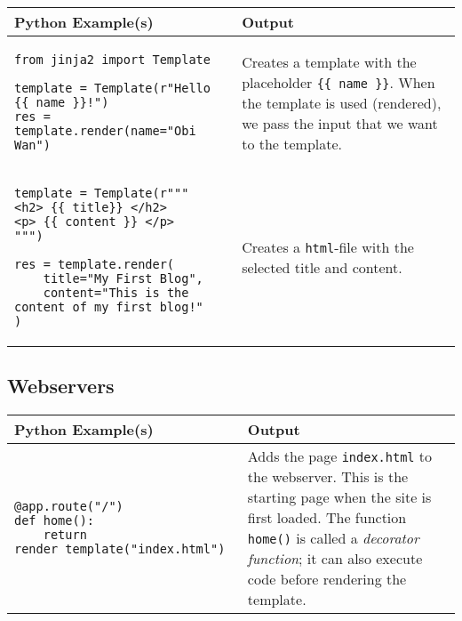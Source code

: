 \documentclass[11pt,a4paper]{report}
\begin{document}
\begin{longtable}{|p{}|p{}|}
\hline
Python  Example(s) & Output  \\
\hline 
\endhead
 \begin{lstlisting}
from jinja2 import Template

template = Template(r"Hello {{ name }}!")
res = template.render(name="Obi Wan")
\end{lstlisting}  & Creates a template with the placeholder \verb|{{ name }}|. When the template is used (rendered), we pass the input that we want to the template. \\
\hline
\begin{lstlisting}
template = Template(r"""
<h2> {{ title}} </h2>
<p> {{ content }} </p>
""")

res = template.render(
    title="My First Blog",
    content="This is the content of my first blog!"
)
\end{lstlisting} &
Creates a \verb|html|-file with the selected title and content. \\
\hline

\end{longtable}

\subsection{Webservers}

\begin{longtable}{|p{}|p{}|}
\hline
Python  Example(s) & Output  \\
\hline 
\endhead
 \begin{lstlisting}
@app.route("/")
def home():
    return render_template("index.html")
\end{lstlisting}  & Adds the page \verb|index.html| to the webserver. This is the starting page when the site is first loaded. The function \verb|home()| is called a \emph{decorator function}; it can also execute code before rendering the template. \\
\hline


\end{longtable}

\newpage
\end{document}
